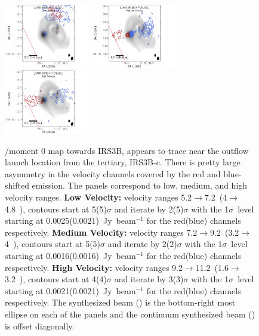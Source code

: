 \begin{figure}[H]
\begin{center}
   \includegraphics[width=0.33\textwidth]{img/L1448IRS3B_H13CN_clean_image_2_binned__low.pdf}
   \includegraphics[width=0.33\textwidth]{img/L1448IRS3B_H13CN_clean_image_2_binned__med.pdf}
   \includegraphics[width=0.33\textwidth]{img/L1448IRS3B_H13CN_clean_image_2_binned__high.pdf} %
\end{center}
   \caption{\htcn/\sot\space moment 0 map towards IRS3B, appears to trace near the outflow launch location from the tertiary, IRS3B-c. There is pretty large asymmetry in the velocity channels covered by the red and blue-shifted emission. The panels correspond to low, medium, and high velocity ranges. \textbf{Low Velocity:} velocity ranges 5.2$\rightarrow$7.2~\kms (4$\rightarrow$4.8~\kms), contours start at 5(5)$\sigma$ and iterate by 2(5)$\sigma$ with the 1$\sigma$~level starting at 0.0025(0.0021)~Jy~beam$^{-1}$ for the red(blue) channels respectively. \textbf{Medium Velocity:} velocity ranges 7.2$\rightarrow$9.2~\kms (3.2$\rightarrow$4~\kms), contours start at 5(5)$\sigma$ and iterate by 2(2)$\sigma$ with the 1$\sigma$~level starting at 0.0016(0.0016)~Jy~beam$^{-1}$ for the red(blue) channels respectively. \textbf{High Velocity:} velocity ranges 9.2$\rightarrow$11.2~\kms (1.6$\rightarrow$3.2~\kms), contours start at 4(4)$\sigma$ and iterate by 3(3)$\sigma$ with the 1$\sigma$~level starting at 0.0021(0.0021)~Jy~beam$^{-1}$ for the red(blue) channels respectively. The \htcn\space synthesized beam (\htcnbeam) is the bottom-right most ellipse on each of the panels and the continuum synthesized beam (\contbeam) is offset diagonally.}\label{fig:irs3bh13cnmoment}
\end{figure}




